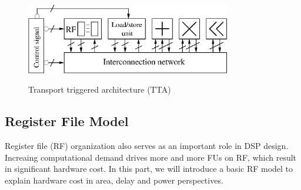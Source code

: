 \documentclass[12pt]{article}
\begin{document}
\begin{CJK}{UTF8}{bkai}
        \begin{figure}[!ht] 
            \caption{Transport triggered architecture (TTA)}
            \centering
            \includegraphics[width=0.8\textwidth]{./figs/tta.eps}
            \label{fig:tta}
        \end{figure}
      

    \subsection{Register File Model}
    Register file (RF) organization also serves as an important role in DSP design. 
    Increaing computational demand drives more and more FUs on RF,
    which result in significant hardware cost.
    In this part, we will introduce a basic RF model to explain hardware cost in area, delay and power perspectives.

\end{CJK}
\end{document}
